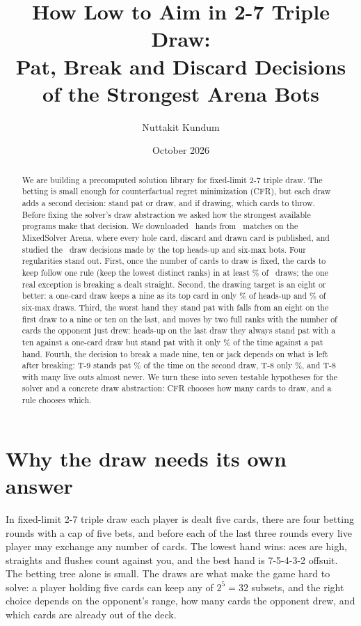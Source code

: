 \documentclass[10pt]{article}
\title{How Low to Aim in 2-7 Triple Draw:\\
Pat, Break and Discard Decisions of the Strongest Arena Bots}
\author{Nuttakit Kundum}
\date{October 2026}
\begin{document}
\maketitle

\begin{abstract}
We are building a precomputed solution library for fixed-limit 2-7 triple draw. The betting is
small enough for counterfactual regret minimization (CFR), but each draw adds a second decision:
stand pat or draw, and if drawing, which cards to throw. Before fixing the solver's draw abstraction
we asked how the strongest available programs make that decision. We downloaded \NHands\ hands from
\NMatchesUsed\ matches on the MixedSolver Arena, where every hole card, discard and drawn card is
published, and studied the \NElite\ draw decisions made by the top heads-up and six-max bots.
Four regularities stand out. First, once the number of cards to draw is fixed, the cards to keep
follow one rule (keep the lowest distinct ranks) in at least \RuleLow\% of \RuleN\ draws; the one
real exception is breaking a dealt straight. Second, the drawing target is an eight or better: a one-card draw keeps
a nine as its top card in only \KeptNineHU\% of heads-up and \KeptNineSix\% of six-max draws. Third,
the worst hand they stand pat with falls from an eight on the first draw to a nine or ten on the
last, and moves by two full ranks with the number of cards the opponent just drew: heads-up on the
last draw they always stand pat with a ten against a one-card draw but stand pat with it only
\PatTenVsPat\% of the time against a pat hand. Fourth, the decision to break a made nine, ten or
jack depends on what is left after breaking: T-9 stands pat \PatTNineTwo\% of the time on the second
draw, T-8 only \PatTEightTwo\%, and T-8 with many live outs almost never. We turn these into seven
testable hypotheses for the solver and a concrete draw abstraction: CFR chooses how many cards to
draw, and a rule chooses which.
\end{abstract}

\section{Why the draw needs its own answer}

In fixed-limit 2-7 triple draw each player is dealt five cards, there are four betting rounds with
a cap of five bets, and before each of the last three rounds every live player may exchange any
number of cards. The lowest hand wins: aces are high, straights and flushes count against you, and
the best hand is 7-5-4-3-2 offsuit. The betting tree alone is small. The draws are what make the
game hard to solve: a player holding five cards can keep any of $2^5=32$ subsets, and the right
choice depends on the opponent's range, how many cards the opponent drew, and which cards are
already out of the deck.
\end{document}
